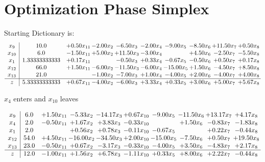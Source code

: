\documentclass[9pt]{article}
\begin{document}
\section{Optimization Phase Simplex}
Starting Dictionary is:
\[\begin{array}{c| c c@{\hskip 2pt} c@{\hskip 2pt} c@{\hskip 2pt} c@{\hskip 2pt} c@{\hskip 2pt} c@{\hskip 2pt} c@{\hskip 2pt} c@{\hskip 2pt} }
 x_{9}   &  10.0 & +  0.50 x_{11} & -2.00 x_{2} & -6.50 x_{3} & -2.00 x_{4} & -9.00 x_{5} & -8.50 x_{6} & + 11.50 x_{7} & +  0.50 x_{8}\\
 x_{10}   &  6.0 & -1.50 x_{11} & +  5.00 x_{2} & + 11.50 x_{3} & -3.00 x_{4} &   & +  4.50 x_{6} & -2.50 x_{7} & -5.50 x_{8}\\
 x_{1}   &  1.33333333333 & +  0.17 x_{11} &   & -0.50 x_{3} & +  0.33 x_{4} & -0.67 x_{5} & -0.50 x_{6} & +  0.50 x_{7} & +  0.17 x_{8}\\
 x_{12}   &  66.0 & +  1.50 x_{11} & -6.00 x_{2} & -11.50 x_{3} & -6.00 x_{4} & -15.00 x_{5} & +  1.50 x_{6} & -4.50 x_{7} & +  8.50 x_{8}\\
 x_{13}   &  21.0  &   & -1.00 x_{2} & -7.00 x_{3} & +  1.00 x_{4} & -4.00 x_{5} & +  2.00 x_{6} & -4.00 x_{7} & +  4.00 x_{8}\\
\hline
z    &  5.33333333333 & +  0.67 x_{11} & -4.00 x_{2} & -6.00 x_{3} & +  3.33 x_{4} & +  0.33 x_{5} & +  3.00 x_{6} & +  5.00 x_{7} & +  5.67 x_{8}\\
\end{array}\]


 $ x_{4} $ enters and $ x_{10} $ leaves 

 \[\begin{array}{c| c c@{\hskip 2pt} c@{\hskip 2pt} c@{\hskip 2pt} c@{\hskip 2pt} c@{\hskip 2pt} c@{\hskip 2pt} c@{\hskip 2pt} c@{\hskip 2pt} }
 x_{9}   &  6.0 & +  1.50 x_{11} & -5.33 x_{2} & -14.17 x_{3} & +  0.67 x_{10} & -9.00 x_{5} & -11.50 x_{6} & + 13.17 x_{7} & +  4.17 x_{8}\\
 x_{4}   &  2.0 & -0.50 x_{11} & +  1.67 x_{2} & +  3.83 x_{3} & -0.33 x_{10} &   & +  1.50 x_{6} & -0.83 x_{7} & -1.83 x_{8}\\
 x_{1}   &  2.0  &   & +  0.56 x_{2} & +  0.78 x_{3} & -0.11 x_{10} & -0.67 x_{5} &   & +  0.22 x_{7} & -0.44 x_{8}\\
 x_{12}   &  54.0 & +  4.50 x_{11} & -16.00 x_{2} & -34.50 x_{3} & +  2.00 x_{10} & -15.00 x_{5} & -7.50 x_{6} & +  0.50 x_{7} & + 19.50 x_{8}\\
 x_{13}   &  23.0 & -0.50 x_{11} & +  0.67 x_{2} & -3.17 x_{3} & -0.33 x_{10} & -4.00 x_{5} & +  3.50 x_{6} & -4.83 x_{7} & +  2.17 x_{8}\\
\hline
z    &  12.0 & -1.00 x_{11} & +  1.56 x_{2} & +  6.78 x_{3} & -1.11 x_{10} & +  0.33 x_{5} & +  8.00 x_{6} & +  2.22 x_{7} & -0.44 x_{8}\\
\end{array}\]
\end{document}
